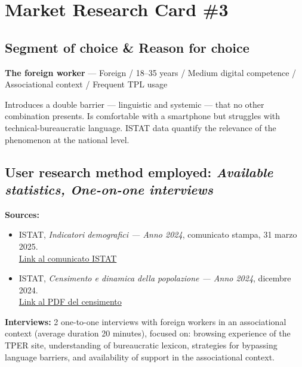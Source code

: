 ﻿\documentclass[11pt,a4paper]{article}
\begin{document}
\newpage
\section{Market Research Card \#3}

\subsection*{Segment of choice \& Reason for choice}
\begin{tcolorbox}[base]
\textbf{The foreign worker} --- Foreign / 18--35 years /
Medium digital competence / Associational context / Frequent TPL
usage

\vspace{0.2cm}
Introduces a double barrier --- linguistic and systemic --- that
no other combination presents. Is comfortable with a smartphone
but struggles with technical-bureaucratic language. ISTAT data quantify
the relevance of the phenomenon at the national level.
\end{tcolorbox}
\subsection*{User research method employed: \textit{Available statistics, One-on-one interviews}}
\begin{tcolorbox}[base]
\textbf{Sources:}
\begin{itemize}[leftmargin=*]
  \item ISTAT, \textit{Indicatori demografici --- Anno 2024},
  comunicato stampa, 31 marzo 2025.\\
  \href{https://www.istat.it/comunicato-stampa/indicatori-demografici-anno-2024/}{Link al comunicato ISTAT}

  \item ISTAT, \textit{Censimento e dinamica della popolazione --- Anno 2024}, dicembre 2024.\\
  \href{https://www.istat.it/wp-content/uploads/2025/12/Censimento-e-dinamica-della-popolazione-Anno-2024.pdf}{Link al PDF del censimento}
\end{itemize}

\vspace{0.2cm}
\textbf{Interviews:} 2 one-to-one interviews with foreign workers
in an associational context (average duration 20 minutes), focused on:
browsing experience of the TPER site, understanding of bureaucratic
lexicon, strategies for bypassing language barriers, and
availability of support in the associational context.
\end{tcolorbox}
\end{document}
